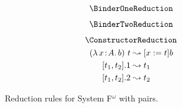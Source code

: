 
\begin{figure}
    \centering
    \begin{minipage}{0.5\textwidth}
        $$\BinderOneReduction$$
    \end{minipage}%
    \begin{minipage}{0.5\textwidth}
        $$\BinderTwoReduction$$
    \end{minipage}%
    $$\ConstructorReduction$$
    \begin{align*}
        ({\lambda}\, x\! : \! A.\, b)\ t &\leadsto [x := t]b \\
        [t_1, t_2].1 &\leadsto t_1 \\
        [t_1, t_2].2 &\leadsto t_2
    \end{align*}
    \caption{Reduction rules for System F$^\omega$ with pairs.}
    \label{fig:reduction_fp}
\end{figure}


